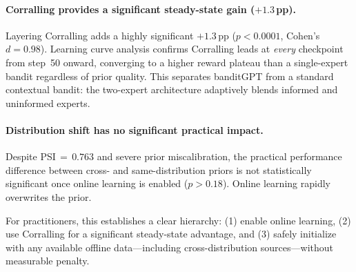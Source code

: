 \paragraph{Corralling provides a significant steady-state gain ($+1.3$\,pp).}
Layering Corralling adds a highly significant $+1.3$\,pp ($p < 0.0001$, Cohen's $d = 0.98$). Learning curve analysis confirms Corralling leads at \emph{every} checkpoint from step~50 onward, converging to a higher reward plateau than a single-expert bandit regardless of prior quality. This separates banditGPT from a standard contextual bandit: the two-expert architecture adaptively blends informed and uninformed experts.

\paragraph{Distribution shift has no significant practical impact.}
Despite PSI$\,{=}\,0.763$ and severe prior miscalibration, the practical performance difference between cross- and same-distribution priors is not statistically significant once online learning is enabled ($p > 0.18$). Online learning rapidly overwrites the prior.

For practitioners, this establishes a clear hierarchy: (1) enable online learning, (2) use Corralling for a significant steady-state advantage, and (3) safely initialize with any available offline data---including cross-distribution sources---without measurable penalty.
